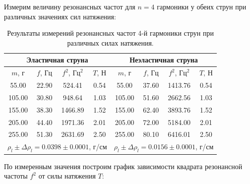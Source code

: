 \documentclass[12pt, a4paper]{article}
\begin{document}
Измерим величину резонансных частот для $n=4$ гармоники у обеих струн при различных значениях сил натяжения:

\begin{table}[H]
\begin{center}
\begin{tabular}{|c|c|c|c|c|c|c|c|}
\hline 
\multicolumn{4}{|c|}{Эластичная струна} & \multicolumn{4}{|c|}{Неэластичная струна}\\ 
\hline 
$m$, г & $f$, Гц & $f^2$, $\text{Гц}^2$ & $T$, Н & $m$, г & $f$, Гц & $f^2$, $\text{Гц}^2$ & $T$, Н \\ 
\hline 
55.00 & 22.90 & 524.41 & 0.54 & 55.00 & 37.60 & 1413.76 & 0.54\\ 
\hline 
105.00 & 30.80 & 948.64 & 1.03 & 105.00 & 51.60 & 2662.56 & 1.03\\ 
\hline 
155.00 & 38.30 & 1466.89 & 1.52 & 155.00 & 62.40 & 3893.76 & 1.52\\ 
\hline 
205.00 & 44.40 & 1971.36 & 2.01 & 205.00 & 72.00 & 5184.00 & 2.01\\ 
\hline 
255.00 & 51.30 & 2631.69 & 2.50 & 255.00 & 80.10 & 6416.01 & 2.50\\ 
\hline 
\multicolumn{4}{|c|}{$\rho_l \pm \Delta \rho_l = 0.0398 \pm 0.0001 $, г/см} & \multicolumn{4}{|c|}{$\rho_l \pm \Delta \rho_l = 0.0156 \pm 0.0001 $, г/см } \\ 
\hline 

\end{tabular}
\caption{Результаты измерений резонансных частот 4-й гармоники струн при различных силах натяжения.}
\label{tab:2}
\end{center}
\end{table}

По измеренным значения построим график зависимости квадрата резонансной частоты $f^2$ от силы натяжения $T$:
\end{document}
